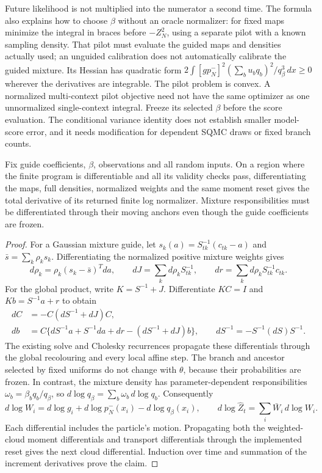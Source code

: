 Future likelihood is not multiplied into the numerator a second time. The
formula also explains how to choose $\beta$ without an oracle normalizer:
for fixed maps minimize the integral in braces before $-Z_N^2$, using a
separate pilot with a known sampling density. That pilot must evaluate the
guided maps and densities actually used; an unguided calibration does not
automatically calibrate the guided mixture. Its Hessian has quadratic form
$2\int [g p_N^-]^2(\sum_b u_bq_b)^2/q_\beta^3\,dx\geq0$ wherever the
derivatives are integrable. The pilot problem is convex. A normalized
multi-context pilot objective need not have the same optimizer as one
unnormalized single-context integral. Freeze its selected $\beta$ before
the score evaluation. The conditional variance identity does not establish
smaller model-score error, and it needs modification for dependent SQMC
draws or fixed branch counts.

\begin{proposition}
\label{prop:bg-mixture-guided-score}
Fix guide coefficients, $\beta$, observations and all random inputs.
On a region where the finite program is differentiable and all its validity
checks pass, differentiating the maps, full densities, normalized weights
and the same moment reset gives the total derivative of its returned finite
log normalizer. Mixture responsibilities must be differentiated through their
moving anchors even though the guide coefficients are frozen.
\end{proposition}
\begin{proof}
For a Gaussian mixture guide, let
$s_k(a)=S_{tk}^{-1}(c_{tk}-a)$ and
$\bar s=\sum_k\rho_ks_k$. Differentiating the normalized positive mixture
weights gives
\[
 d\rho_k=\rho_k(s_k-\bar s)^Tda,\qquad
 dJ=\sum_kd\rho_k S_{tk}^{-1},\qquad
 dr=\sum_kd\rho_k S_{tk}^{-1}c_{tk}.
\]
For the global product, write $K=S^{-1}+J$. Differentiate $KC=I$ and
$Kb=S^{-1}a+r$ to obtain
\begin{align}
 dC&=-C(dS^{-1}+dJ)C,\nonumber\\
 db&=C\{dS^{-1}a+S^{-1}da+dr-(dS^{-1}+dJ)b\},
 \qquad dS^{-1}=-S^{-1}(dS)S^{-1}.
 \label{eq:bg-mixture-global-tangent}
\end{align}
The existing solve and Cholesky recurrences propagate these differentials
through the global recolouring and every local affine step. The branch and
ancestor selected by fixed uniforms do not change with $\theta$, because
their probabilities are frozen. In contrast, the mixture density has
parameter-dependent responsibilities $\omega_b=\beta_bq_b/q_\beta$, so
$d\log q_\beta=\sum_b\omega_b\,d\log q_b$.
Consequently
\[
 d\log W_i=d\log g_i+d\log p_N^-(x_i)-d\log q_\beta(x_i),\qquad
 d\log\widehat Z_t=\sum_i\bar W_i\,d\log W_i.
\]
Each differential includes the particle's motion. Propagating both the
weighted-cloud moment differentials and transport differentials through the
implemented reset gives the next cloud differential. Induction over time
and summation of the increment derivatives prove the claim.
\end{proof}


